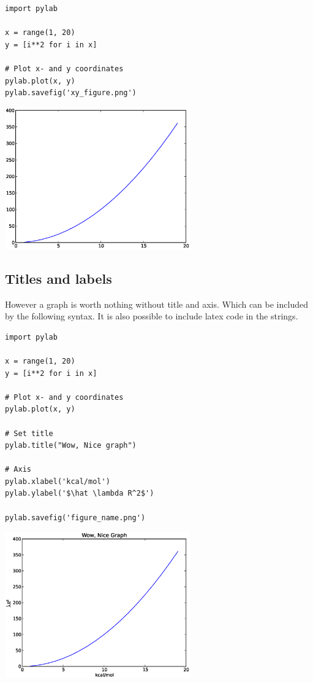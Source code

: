 \documentclass{article}
\begin{document}
\begin{multicols}{2}

\begin{lstlisting}
import pylab

x = range(1, 20)
y = [i**2 for i in x]

# Plot x- and y coordinates
pylab.plot(x, y)
pylab.savefig('xy_figure.png')

\end{lstlisting}
\columnbreak
\includegraphics[width=0.6\textwidth]{py/xy_figure.eps}
\end{multicols}


\newpage
\subsection{Titles and labels}

However a graph is worth nothing without title and axis.
Which can be included by the following syntax.
It is also possible to include latex code in the strings.

\begin{multicols}{2}

\begin{lstlisting}
import pylab

x = range(1, 20)
y = [i**2 for i in x]

# Plot x- and y coordinates
pylab.plot(x, y)

# Set title
pylab.title("Wow, Nice graph")

# Axis
pylab.xlabel('kcal/mol')
pylab.ylabel('$\hat \lambda R^2$')

pylab.savefig('figure_name.png')
\end{lstlisting}
\columnbreak
\includegraphics[width=0.6\textwidth]{py/figure_title.eps}
\end{multicols}
\end{document}
